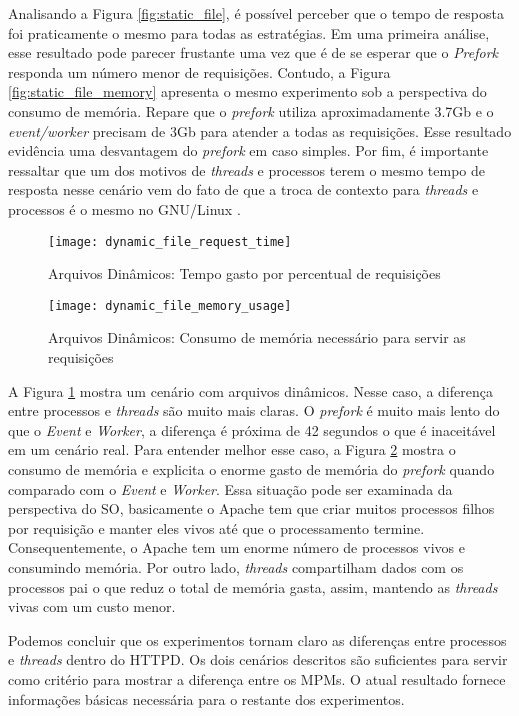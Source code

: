 Analisando a Figura \ref{fig:static_file}, é possível perceber que o tempo de
resposta foi praticamente o mesmo para todas as estratégias. Em uma primeira
análise, esse resultado pode parecer frustante uma vez que é de se esperar que
o \emph{Prefork} responda um número menor de requisições. Contudo, a Figura
\ref{fig:static_file_memory} apresenta o mesmo experimento sob a perspectiva do
consumo de memória. Repare que o \emph{prefork} utiliza aproximadamente 3.7Gb e
o \emph{event/worker} precisam de 3Gb para atender a todas as requisições. Esse
resultado evidência uma desvantagem do \emph{prefork} em caso simples. Por fim,
é importante ressaltar que um dos motivos de \emph{threads} e processos terem o
mesmo tempo de resposta nesse cenário vem do fato de que a troca de contexto
para \emph{threads} e processos é o mesmo no GNU/Linux
\citep{linux_kernel_development}.

\begin{figure}[!h] \centering
\texttt{[image: dynamic\_file\_request\_time]}
\caption{Arquivos Dinâmicos: Tempo gasto por percentual de requisições}
\label{fig:dynamic_file} \end{figure}

\begin{figure}[!h] \centering
\texttt{[image: dynamic\_file\_memory\_usage]}
\caption{Arquivos Dinâmicos: Consumo de memória necessário para servir as
requisições} \label{fig:dynamic_file_memory} \end{figure}

A Figura \ref{fig:dynamic_file} mostra um cenário com arquivos dinâmicos. Nesse
caso, a diferença entre processos e \emph{threads} são muito mais claras. O
\emph{prefork} é muito mais lento do que o \emph{Event} e \emph{Worker}, a
diferença é próxima de 42 segundos o que é inaceitável em um cenário real.
Para entender melhor esse caso, a Figura \ref{fig:dynamic_file_memory} mostra o
consumo de memória e explicita o enorme gasto de memória do \emph{prefork}
quando comparado com o \emph{Event} e \emph{Worker}. Essa situação pode ser
examinada da perspectiva do SO, basicamente o Apache tem que criar muitos
processos filhos por requisição e manter eles vivos até que o processamento
termine. Consequentemente, o Apache tem um enorme número de processos vivos e
consumindo memória. Por outro lado, \emph{threads} compartilham dados com os
processos pai o que reduz o total de memória gasta, assim, mantendo as
\emph{threads} vivas com um custo menor.

Podemos concluir que os experimentos tornam claro as diferenças entre processos
e \emph{threads} dentro do HTTPD. Os dois cenários descritos são suficientes
para servir como critério para mostrar a diferença entre os MPMs. O atual
resultado fornece informações básicas necessária para o restante dos
experimentos.

